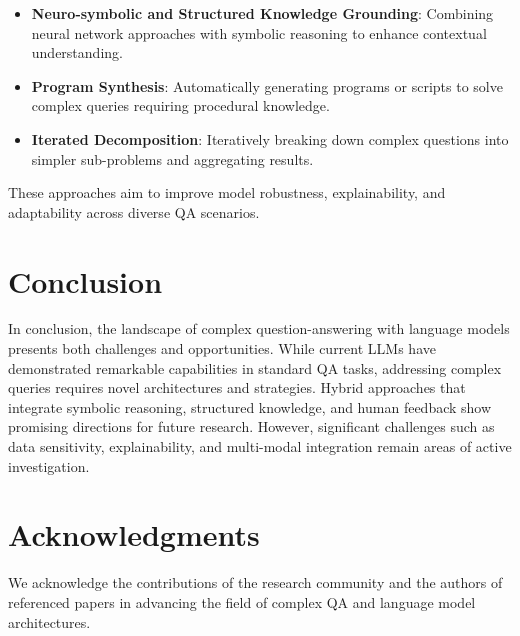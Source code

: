 \documentclass{article}
\begin{document}
\begin{itemize}
    \item \textbf{Neuro-symbolic and Structured Knowledge Grounding}: Combining neural network approaches with symbolic reasoning to enhance contextual understanding.
    \item \textbf{Program Synthesis}: Automatically generating programs or scripts to solve complex queries requiring procedural knowledge.
    \item \textbf{Iterated Decomposition}: Iteratively breaking down complex questions into simpler sub-problems and aggregating results.
\end{itemize}

These approaches aim to improve model robustness, explainability, and adaptability across diverse QA scenarios.

\section{Conclusion}
In conclusion, the landscape of complex question-answering with language models presents both challenges and opportunities. While current LLMs have demonstrated remarkable capabilities in standard QA tasks, addressing complex queries requires novel architectures and strategies. Hybrid approaches that integrate symbolic reasoning, structured knowledge, and human feedback show promising directions for future research. However, significant challenges such as data sensitivity, explainability, and multi-modal integration remain areas of active investigation.

\section*{Acknowledgments}
We acknowledge the contributions of the research community and the authors of referenced papers in advancing the field of complex QA and language model architectures.



\end{document}
